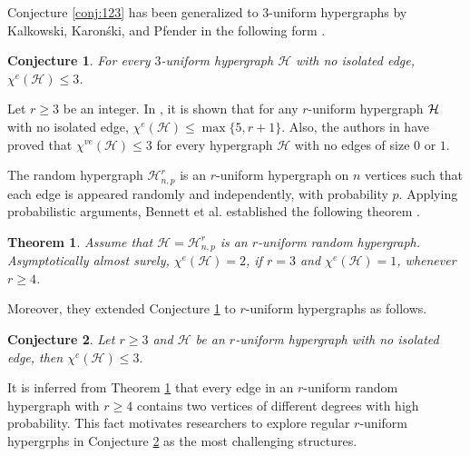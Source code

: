 \documentclass[12pt,a4paper]{article}
\newtheorem{theorem}{\bf Theorem}[section]
\newtheorem{conjecture}{\bf Conjecture}
\begin{document}
Conjecture \ref{conj:123} has been generalized to $3$-uniform hypergraphs by Kalkowski,  Karon\'{s}ki, and Pfender in the following form \cite{KKP-H}.

\begin{conjecture}{\em\cite{KKP-H}}\label{conj:3-HYPER}
	For every $3$-uniform hypergraph $ \mathcal{H} $ with no  isolated edge, $ \chi^{e}(\mathcal{H})\leq 3 $.
\end{conjecture}
Let  $r\geq 3$ be an integer. In \cite{KKP-H}, it is shown that for any $r$-uniform hypergraph $ \cal H $ with no
isolated edge, $\chi^{e}(\mathcal{H})\leq{\max}\{5, r + 1\}$. Also, the authors in \cite{KKP-H} have proved that $\chi^{ve}(\mathcal{H})\leq 3$ for every hypergraph $\mathcal{H}$ with no edges of size $0$ or $1$.

The random hypergraph  $ \mathcal{H}^{r}_{n,p} $ is an $r$-uniform hypergraph on $n$ vertices such that each  edge is appeared randomly and independently, with probability $p$.
Applying probabilistic arguments, Bennett et al.  established  the following theorem  \cite{BDFL}.
\begin{theorem}\label{thm:almost}{\em\cite{BDFL}}
	Assume that $ \mathcal{H}= \mathcal{H}^{r}_{n,p}  $ is an $ r $-uniform random hypergraph. Asymptotically almost surely,  $ \chi^{e}(\mathcal{H})=2 $, if $ r=3 $ and   $ \chi^{e}(\mathcal{H})=1 $, whenever $ r\geq 4  $.
\end{theorem}

Moreover, they extended Conjecture \ref{conj:3-HYPER} to $r$-uniform hypergraphs as follows.
\begin{conjecture}\label{conj:r-HYPER}{\em\cite{BDFL}}
	Let $r \geq 3$ and  $\mathcal{H}$ be an $r$-uniform hypergraph  with no isolated edge, then $ \chi^{e}(\mathcal{H})\leq 3. $
\end{conjecture}
It is inferred from Theorem \ref{thm:almost} that every edge in an  $ r $-uniform random hypergraph with $ r\geq 4 $ contains two vertices of different degrees with   high probability. This fact motivates researchers to explore regular $ r $-uniform hypergrphs in Conjecture \ref{conj:r-HYPER} as the most challenging structures.
\end{document}
